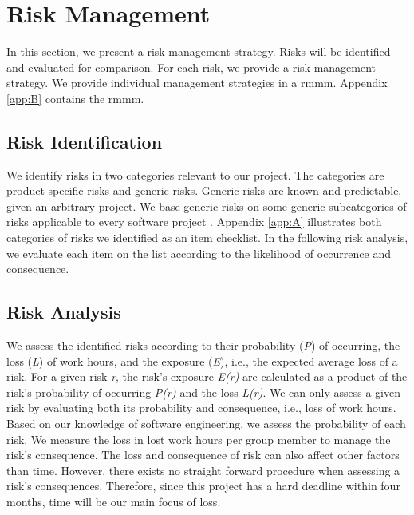\section{Risk Management}
In this section, we present a risk management strategy. Risks will be identified and evaluated for comparison. For each risk, we provide a risk management strategy. We provide individual management strategies in a \Gls{rmmm}. Appendix \ref{app:B} contains the \Gls{rmmm}.

\subsection{Risk Identification}
We identify risks in two categories relevant to our project. The categories are product-specific risks and generic risks. Generic risks are known and predictable, given an arbitrary project. We base generic risks on some generic subcategories of risks applicable to every software project \cite[p.~747]{a_practitioners_approach}. Appendix \ref{app:A} illustrates both categories of risks we identified as an item checklist. In the following risk analysis, we evaluate each item on the list according to the likelihood of occurrence and consequence.


\subsection{Risk Analysis}
We assess the identified risks according to their probability (\textit{P}) of occurring, the loss (\textit{L}) of work hours, and the exposure (\textit{E}), i.e., the expected average loss of a risk. For a given risk \textit{r}, the risk's exposure \textit{E(r)} are calculated as a product of the risk's probability of occurring \textit{P(r)} and the loss \textit{L(r)}. We can only assess a given risk by evaluating both its probability and consequence, i.e., loss of work hours. Based on our knowledge of software engineering, we assess the probability of each risk. We measure the loss in lost work hours per group member to manage the risk's consequence. The loss and consequence of risk can also affect other factors than time. However, there exists no straight forward procedure when assessing a risk's consequences. Therefore, since this project has a hard deadline within four months, time will be our main focus of loss. 
\newline

